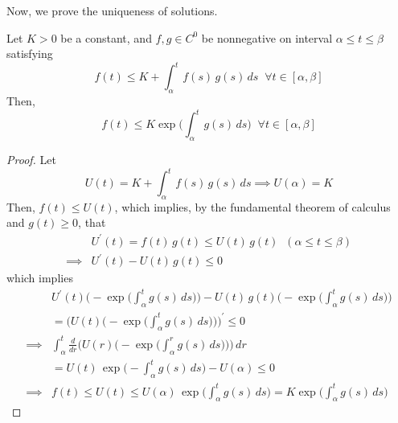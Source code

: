 \documentclass{article}
\newcounter{theorem}[section]
\begin{document}
    Now, we prove the uniqueness of solutions. 
    \begin{lemma}
      \label{thm:gronwall-inequality}
    Let $K > 0$ be a constant, and $f, g \in C^0$ be nonnegative on interval $\alpha \leq t \leq \beta$ satisfying 
    \begin{equation}
      f(t) \leq K + \int_\alpha^t f(s)\,g(s) \,ds \;\; \forall t \in [\alpha, \beta]
    \end{equation}
    Then, 
    \begin{equation}
      f(t) \leq K \exp \bigg( \int_{\alpha}^t g(s) \,ds \bigg) \;\; \forall t \in [\alpha, \beta]
    \end{equation}
    \end{lemma}
    \begin{proof}
    Let 
    \begin{equation}
      U(t) = K + \int_\alpha^t f(s) \, g(s) \, ds \implies U (\alpha) = K
    \end{equation}
    Then, $f(t) \leq U(t)$, which implies, by the fundamental theorem of calculus and $g(t) \geq 0$, that 
    \begin{align*}
        & U^\prime (t) = f(t)\,g(t) \leq U(t) \, g(t) \;\; (\alpha \leq t \leq \beta) \\
        \implies & U^\prime (t) - U(t) \, g(t) \leq 0
    \end{align*}
    which implies
    \begin{align*}
        & U^\prime (t) \bigg( - \exp \Big( \int_\alpha^t g(s) \, ds \Big)\bigg) - U(t) \, g(t) \bigg( - \exp \Big( \int_\alpha^t g(s) \, ds \Big)\bigg) \\
        & = \Bigg( U(t) \bigg( - \exp \Big( \int_\alpha^t g(s) \, ds \Big)\bigg) \Bigg)^\prime \leq 0 \\
        \implies & \int_\alpha^t \frac{d}{dr} \bigg( U(r) \bigg( - \exp \Big( \int_\alpha^r g(s) \, ds \Big)\bigg) \bigg) \,dr \\
        & = U(t) \, \exp \Big( -\int_\alpha^t g(s)\,ds \Big) - U(\alpha) \leq 0 \\
        \implies & f(t) \leq U(t) \leq U(\alpha) \, \exp \Big( \int_\alpha^t g(s)\,ds \Big) = K \exp \Big( \int_\alpha^t g(s) \, ds\Big) 
    \end{align*}
    \end{proof}
\end{document}
